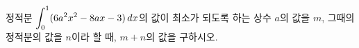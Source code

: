 정적분 $\displaystyle\int_{0}^{1}(6a^2x^2-8ax-3)\mkern3mu dx$의 값이 최소가 되도록 하는 상수 $a$의 값을 $m$, 그때의 정적분의 값을 $n$이라 할 때, $m+n$의 값을 구하시오.

